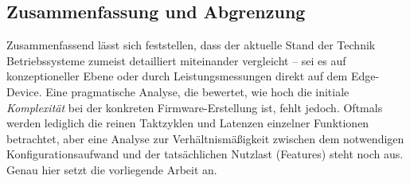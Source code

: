 \subsection{Zusammenfassung und Abgrenzung}
Zusammenfassend lässt sich feststellen, dass der aktuelle Stand der Technik Betriebssysteme zumeist detailliert miteinander vergleicht – sei es auf konzeptioneller Ebene oder durch Leistungsmessungen direkt auf dem Edge-Device. Eine pragmatische Analyse, die bewertet, wie hoch die initiale \textit{Komplexität} bei der konkreten Firmware-Erstellung ist, fehlt jedoch. Oftmals werden lediglich die reinen Taktzyklen und Latenzen einzelner Funktionen betrachtet, aber eine Analyse zur Verhältnismäßigkeit zwischen dem notwendigen Konfigurationsaufwand und der tatsächlichen Nutzlast (Features) steht noch aus. Genau hier setzt die vorliegende Arbeit an.
